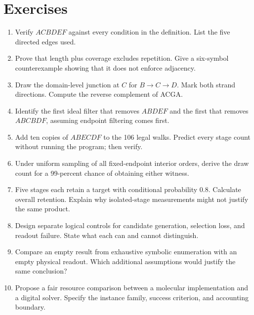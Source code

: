 \section{Exercises}\label{sec:exercises}
\begin{enumerate}
\item Verify $ACBDEF$ against every condition in the definition. List the five directed edges used.
\item Prove that length plus coverage excludes repetition. Give a six-symbol counterexample showing that it does not enforce adjacency.
\item Draw the domain-level junction at $C$ for $B\to C\to D$. Mark both strand directions. Compute the reverse complement of ACGA.
\item Identify the first ideal filter that removes $ABDEF$ and the first that removes $ABCBDF$, assuming endpoint filtering comes first.
\item Add ten copies of $ABECDF$ to the 106 legal walks. Predict every stage count without running the program; then verify.
\item Under uniform sampling of all fixed-endpoint interior orders, derive the draw count for a 99-percent chance of obtaining either witness.
\item Five stages each retain a target with conditional probability 0.8. Calculate overall retention. Explain why isolated-stage measurements might not justify the same product.
\item Design separate logical controls for candidate generation, selection loss, and readout failure. State what each can and cannot distinguish.
\item Compare an empty result from exhaustive symbolic enumeration with an empty physical readout. Which additional assumptions would justify the same conclusion?
\item Propose a fair resource comparison between a molecular implementation and a digital solver. Specify the instance family, success criterion, and accounting boundary.
\end{enumerate}

